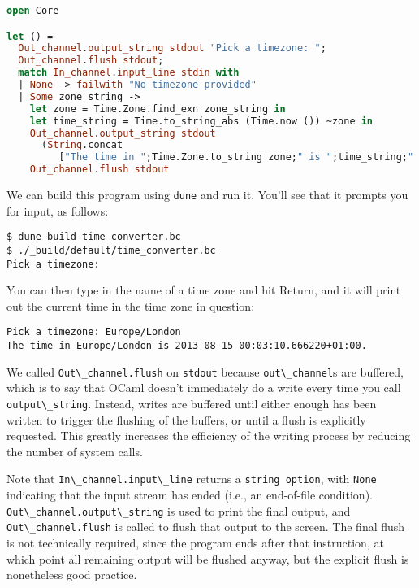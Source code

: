 \begin{lstlisting}[language=Caml]
open Core

let () =
  Out_channel.output_string stdout "Pick a timezone: ";
  Out_channel.flush stdout;
  match In_channel.input_line stdin with
  | None -> failwith "No timezone provided"
  | Some zone_string ->
    let zone = Time.Zone.find_exn zone_string in
    let time_string = Time.to_string_abs (Time.now ()) ~zone in
    Out_channel.output_string stdout
      (String.concat
         ["The time in ";Time.Zone.to_string zone;" is ";time_string;".\n"]);
    Out_channel.flush stdout
\end{lstlisting}

We can build this program using \passthrough{\lstinline!dune!} and run
it. You'll see that it prompts you for input, as follows:

\begin{lstlisting}
$ dune build time_converter.bc
$ ./_build/default/time_converter.bc
Pick a timezone:
\end{lstlisting}

You can then type in the name of a time zone and hit Return, and it will
print out the current time in the time zone in question:

\begin{lstlisting}
Pick a timezone: Europe/London
The time in Europe/London is 2013-08-15 00:03:10.666220+01:00.
\end{lstlisting}

We called \passthrough{\lstinline!Out\_channel.flush!} on
\passthrough{\lstinline!stdout!} because
\passthrough{\lstinline!out\_channel!}s are buffered, which is to say
that OCaml doesn't immediately do a write every time you call
\passthrough{\lstinline!output\_string!}. Instead, writes are buffered
until either enough has been written to trigger the flushing of the
buffers, or until a flush is explicitly requested. This greatly
increases the efficiency of the writing process by reducing the number
of system calls.

Note that \passthrough{\lstinline!In\_channel.input\_line!} returns a
\passthrough{\lstinline!string option!}, with
\passthrough{\lstinline!None!} indicating that the input stream has
ended (i.e., an end-of-file condition).
\passthrough{\lstinline!Out\_channel.output\_string!} is used to print
the final output, and \passthrough{\lstinline!Out\_channel.flush!} is
called to flush that output to the screen. The final flush is not
technically required, since the program ends after that instruction, at
which point all remaining output will be flushed anyway, but the
explicit flush is nonetheless good practice.

